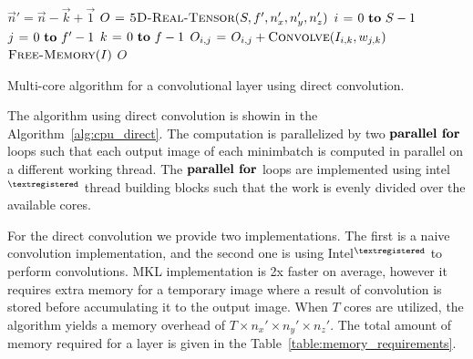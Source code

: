 \documentclass[conference]{IEEEtran}
\begin{document}
  \begin{algorithm}
    {\small
      \begin{codebox}
        \li $\vec{n}' = \vec{n} - \vec{k} + \vec{1}$
        \li $O \mathrel{\hspace{1pt}=\hspace{1pt}} \textnormal{\scshape5D-Real-Tensor}(S,f',n'_x,n'_y,n'_z)$
        \li {} $i \gets 0 \To S-1$
        \li   \Do {} $j \gets 0 \To f'-1$
        \li     \Do \For $k \gets 0 \To f-1$
        \li     \Do $O_{i,j} \mathrel{\hspace{1pt}=\hspace{1pt}} O_{i,j} + \textnormal{\scshape Convolve}(I_{i,k},w_{j,k})$
        \End \End \End
        \li $\textnormal{\scshape Free-Memory}(I)$
        \li \Return $O$
      \end{codebox}
    }

    \caption{Multi-core algorithm for a convolutional layer using direct
      convolution.}
    \label{alg:cpu_direct}
  \end{algorithm}

  The algorithm using direct convolution is showin in the
  Algorithm~\ref{alg:cpu_direct}.  The computation is parallelized by
  two $\textbf{parallel for}$ loops such that each output image of each
  minimbatch is computed in parallel on a different working thread.
  The $\textbf{parallel for}$ loops are implemented using intel$^{\small
    \textregistered}$ thread building blocks such that the work is
  evenly divided over the available cores.

  For the direct convolution we provide two implementations.  The
  first is a naive convolution implementation, and the second one is
  using Intel$^{\small \textregistered}$ to perform convolutions.  MKL
  implementation is 2x faster on average, however it requires extra
  memory for a temporary image where a result of convolution is stored
  before accumulating it to the output image.  When $T$ cores are
  utilized, the algorithm yields a memory overhead of $T \times n_x'
  \times n_y' \times n_z'$.  The total amount of memory required for a
  layer is given in the Table~\ref{table:memory_requirements}.
\end{document}
